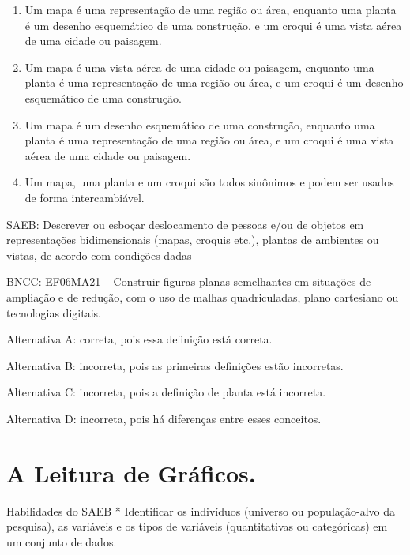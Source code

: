 \begin{enumerate}
\def\labelenumi{\alph{enumi})}
\item
  Um mapa é uma representação de uma região ou área, enquanto uma planta
  é um desenho esquemático de uma construção, e um croqui é uma vista
  aérea de uma cidade ou paisagem.
\item
  Um mapa é uma vista aérea de uma cidade ou paisagem, enquanto uma
  planta é uma representação de uma região ou área, e um croqui é um
  desenho esquemático de uma construção.
\item
  Um mapa é um desenho esquemático de uma construção, enquanto uma
  planta é uma representação de uma região ou área, e um croqui é uma
  vista aérea de uma cidade ou paisagem.
\item
  Um mapa, uma planta e um croqui são todos sinônimos e podem ser usados
  de forma intercambiável.
\end{enumerate}

SAEB: Descrever ou esboçar deslocamento de pessoas e/ou de objetos em
representações bidimensionais (mapas, croquis etc.), plantas de
ambientes ou vistas, de acordo com condições dadas

BNCC: EF06MA21 -- Construir figuras planas semelhantes em situações de
ampliação e de redução, com o uso de malhas quadriculadas, plano
cartesiano ou tecnologias digitais.

Alternativa A: correta, pois essa definição está correta.

Alternativa B: incorreta, pois as primeiras definições estão incorretas.

Alternativa C: incorreta, pois a definição de planta está incorreta.

Alternativa D: incorreta, pois há diferenças entre esses conceitos.

\chapter{ A Leitura de Gráficos.}

Habilidades do SAEB * Identificar os indivíduos (universo ou
população-alvo da pesquisa), as variáveis e os tipos de variáveis
(quantitativas ou categóricas) em um conjunto de dados.

